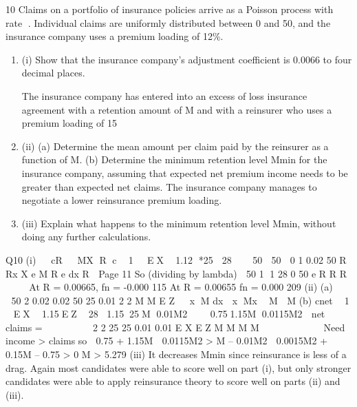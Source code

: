 \documentclass[a4paper,12pt]{article}
\begin{document}
10 Claims on a portfolio of insurance policies arrive as a Poisson process with  rate . Individual claims are uniformly distributed between 0 and 50, and the
insurance company uses a premium loading of 12\%.
\begin{enumerate}
    \item (i) Show that the insurance company’s adjustment coefficient is 0.0066 to four
decimal places.

The insurance company has entered into an excess of loss insurance agreement with a retention amount of M and with a reinsurer who uses a premium loading of 15%
  \item (ii) (a) Determine the mean amount per claim paid by the reinsurer as a
function of M.
(b) Determine the minimum retention level Mmin for the insurance
company, assuming that expected net premium income needs to be greater than expected net claims.
\medskip
The insurance company manages to negotiate a lower reinsurance premium loading.
  \item (iii) Explain what happens to the minimum retention level Mmin, without doing
any further calculations. 
\end{enumerate}

\newpage

Q10 (i)   cR   MX R
c  1 EX  1.12 *25  28 
  50  50 
0
1
0.02
50
R
Rx
X
e
M R e dx
R

Page 11
So (dividing by lambda)
 50 1
1 28 0
50
e R
R
R

  
At R = 0.00665, fn = -0.000 115
At R = 0.00655 fn = 0.000 209
(ii) (a)    
50 2
0.02 0.02 50 25 0.01 2
2 M
M
E Z   x M dx  x Mx  M  M
(b) cnet  1 EX  1.15EZ
 28 1.1525M 0.01M2 
 0.751.15M 0.0115M2 
net claims =      
 
2
2
25 25 0.01
0.01
E X E Z M M
M M
     
  
Need income > claims so
 0.75 + 1.15M  0.0115M2 > M – 0.01M2
 0.0015M2 + 0.15M – 0.75 > 0
M > 5.279
(iii) It decreases Mmin since reinsurance is less of a drag.
Again most candidates were able to score well on part (i), but only stronger candidates were able to apply reinsurance theory to score well on parts (ii)
and (iii).
\end{document}
